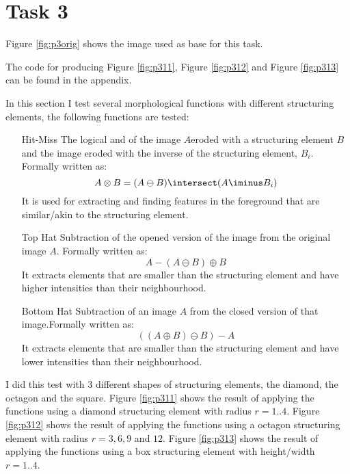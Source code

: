\section{Task 3}
Figure \ref{fig:p3orig} shows the image used as base for this task.


The code for producing Figure \ref{fig:p311}, Figure \ref{fig:p312} and Figure \ref{fig:p313} can be
found in the appendix.

In this section I test several morphological functions with different structuring elements, the following functions are tested:
\begin{itemize}
    \item[Hit-Miss] The logical and  of the image $A$eroded with a structuring element $B$ and the
    image eroded with the inverse of the structuring element, $B_i$. Formally written as:
   \[ A \otimes B = (A \ominus B) \intersect (A \iminus B_i) \]
   It is used for extracting and finding features in the foreground that are similar/akin to the structuring element.
   
   \item[Top Hat] Subtraction of the opened version of the image from the original image $A$. Formally written as:
   \[ A - (A \ominus B) \oplus B \]
   It extracts elements that are smaller than the structuring element and have higher intensities than their neighbourhood.
   
   \item[Bottom Hat] Subtraction of an image $A$ from the closed version of that image.Formally written as:
   \[ ((A \oplus B) \ominus B) - A \]
   It extracts elements that are smaller than the structuring element and have lower intensities than their neighbourhood.
\end{itemize}

I did this test with 3 different shapes of structuring elements, the diamond, the octagon and the square.
Figure \ref{fig:p311} shows the result of applying the functions using a diamond structuring element with radius $r=1..4$.
Figure \ref{fig:p312} shows the result of applying the functions using a octagon structuring element with radius $r=3, 6, 9$ and $12$.
Figure \ref{fig:p313} shows the result of applying the functions using a box structuring element with height/width $r=1..4$.

